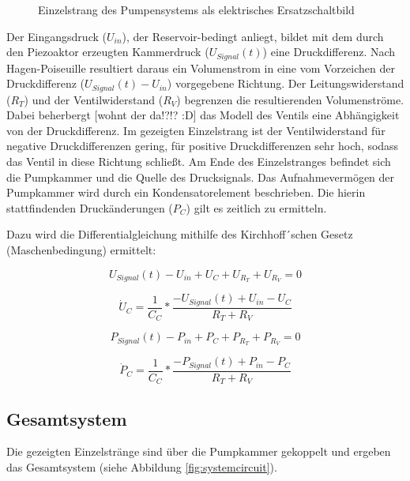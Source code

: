 \documentclass[fontsize=12pt, a4paper]{scrartcl}
\begin{document}
\begin{figure}[H]
	
	\caption{Einzelstrang des Pumpensystems als elektrisches Ersatzschaltbild}
	\label{singlebranch}
\end{figure}

Der Eingangsdruck ($U_{in}$), der Reservoir-bedingt anliegt, bildet mit dem durch den Piezoaktor erzeugten Kammerdruck ($U_{Signal}(t)$) eine Druckdifferenz. Nach Hagen-Poiseuille resultiert daraus ein Volumenstrom in eine vom Vorzeichen der Druckdifferenz ($U_{Signal}(t)-U_{in}$) vorgegebene Richtung. Der Leitungswiderstand ($R_{T}$) und der Ventilwiderstand ($R_{V}$) begrenzen die resultierenden Volumenströme. Dabei beherbergt [wohnt der da!?!? :D] das Modell des Ventils eine Abhängigkeit von der Druckdifferenz. Im gezeigten Einzelstrang ist der Ventilwiderstand für negative Druckdifferenzen gering, für positive Druckdifferenzen sehr hoch, sodass das Ventil in diese Richtung schließt. Am Ende des Einzelstranges befindet sich die Pumpkammer und die Quelle des Drucksignals. Das Aufnahmevermögen der Pumpkammer wird durch ein Kondensatorelement beschrieben. Die hierin stattfindenden Druckänderungen ($P_{C}$) gilt es zeitlich zu ermitteln.

Dazu wird die Differentialgleichung mithilfe des Kirchhoff´schen Gesetz (Maschenbedingung) ermittelt:

\begin{equation}
	U_{Signal}(t) - U_{in} + U_{C} + U_{R_{T}} + U_{R_{V}} = 0
\end{equation}

\begin{equation}
	\dot{U}_{C} = \frac{1}{C_{C}} * \frac{-U_{Signal}(t)+U_{in}-U_{C}}{R_{T}+R_{V}}
\end{equation}

\begin{equation}
	P_{Signal}(t) - P_{in} + P_{C} + P_{R_{T}} + P_{R_{V}} = 0
\end{equation}

\begin{equation}
	\dot{P}_{C} = \frac{1}{C_{C}} * \frac{-P_{Signal}(t)+P_{in}-P_{C}}{R_{T}+R_{V}}
\end{equation}


\subsection{Gesamtsystem}

Die gezeigten Einzelstränge sind über die Pumpkammer gekoppelt und ergeben das Gesamtsystem (siehe Abbildung \ref{fig:systemcircuit}).
\end{document}
